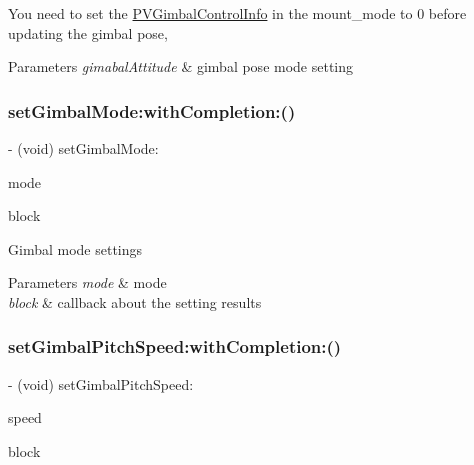 You need to set the \hyperlink{struct_p_v_gimbal_control_info}{P\+V\+Gimbal\+Control\+Info} in the mount\+\_\+mode to 0 before updating the gimbal pose,


\begin{DoxyParams}{Parameters}
{\em gimabal\+Attitude} & gimbal pose mode setting \\
\hline
\end{DoxyParams}
\mbox{\label{interface_p_v_gimabal_ac2bc32c8869d1f5f36c87eb47313fc7e}} 
\subsubsection{\texorpdfstring{set\+Gimbal\+Mode\+:with\+Completion\+:()}{setGimbalMode:withCompletion:()}}
{\footnotesize\ttfamily -\/ (void) set\+Gimbal\+Mode\+: \begin{DoxyParamCaption}\item[{(P\+V\+Gimbal\+Mode)}]{mode }\item[{withCompletion:(P\+V\+Completion\+Block)}]{block }\end{DoxyParamCaption}}

Gimbal mode settings


\begin{DoxyParams}{Parameters}
{\em mode} & mode \\
\hline
{\em block} & callback about the setting results \\
\hline
\end{DoxyParams}
\mbox{\label{interface_p_v_gimabal_a03d3aac39d87e50384c388f1dc28c012}} 
\subsubsection{\texorpdfstring{set\+Gimbal\+Pitch\+Speed\+:with\+Completion\+:()}{setGimbalPitchSpeed:withCompletion:()}}
{\footnotesize\ttfamily -\/ (void) set\+Gimbal\+Pitch\+Speed\+: \begin{DoxyParamCaption}\item[{(int)}]{speed }\item[{withCompletion:(P\+V\+Completion\+Block)}]{block }\end{DoxyParamCaption}}

